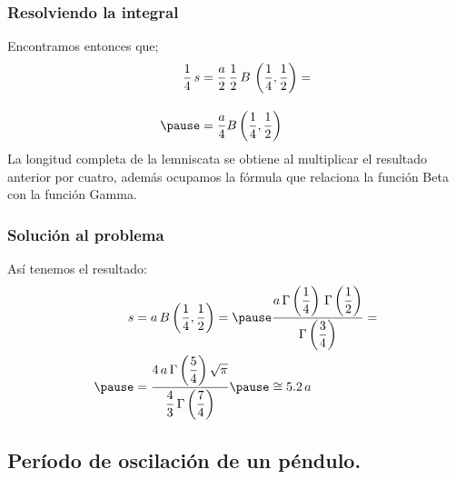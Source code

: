 \documentclass[12pt]{beamer}
\begin{document}
\begin{frame}
\frametitle{Resolviendo la integral}
Encontramos entonces que;
\begin{eqnarray*}
\begin{aligned}
\dfrac{1}{4} \, s &= \dfrac{a}{2} \, \dfrac{1}{2} \, B \, \left(\dfrac{1}{4}, \dfrac{1}{2} \right) = \\[1em] \pause
&= \dfrac{a}{4} B\left(\dfrac{1}{4}, \dfrac{1}{2} \right)
\end{aligned}
\end{eqnarray*}
\pause
\fontsize{12}{12}\selectfont
La longitud completa de la lemniscata se obtiene al multiplicar el resultado anterior por cuatro, además ocupamos la fórmula que relaciona la función Beta con la función Gamma.
\end{frame}
\begin{frame}
\frametitle{Solución al problema}
Así tenemos el resultado:
\begin{eqnarray*}
\begin{aligned}
s &= a \, B\left(\dfrac{1}{4}, \dfrac{1}{2} \right) = \pause \dfrac{a \, \Gamma \left( \dfrac{1}{4} \right) \, \Gamma \left( \dfrac{1}{2} \right) }{\Gamma \left( \dfrac{3}{4} \right)} = \\ \pause
&= \dfrac{4 \, a \, \Gamma \left( \dfrac{5}{4} \right) \sqrt{\pi}}{\dfrac{4}{3} \, \Gamma \left( \dfrac{7}{4} \right)} \pause \cong 5.2 \, a
\end{aligned}
\end{eqnarray*}
\end{frame}

\subsection{Período de oscilación de un péndulo.}
\end{document}
